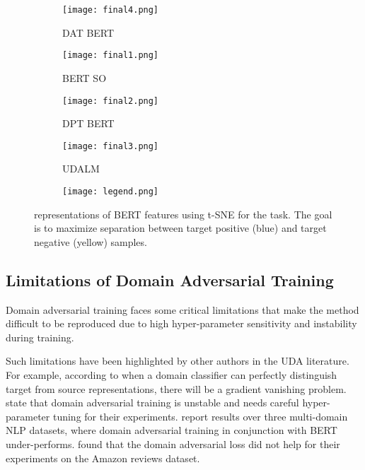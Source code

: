 \documentclass[11pt]{article}
\begin{document}
\begin{figure*}[ht]
\centering
\begin{subfigure}[t]{0.34\textwidth}
\centering
         \texttt{[image: final4.png]}
         \caption{DAT BERT}
         \label{fig:advtsne}
\end{subfigure}
\begin{subfigure}[t]{0.34\textwidth}
\centering
         \texttt{[image: final1.png]}
         \caption{BERT SO}
         \label{fig:atsne}
\end{subfigure}

\begin{subfigure}[t]{0.34\textwidth}
\centering
         \texttt{[image: final2.png]}
         \caption{DPT BERT}
         \label{fig:btsne}
\end{subfigure}
\begin{subfigure}[t]{0.34\textwidth}
\centering
         \texttt{[image: final3.png]}
         \caption{UDALM}
         \label{fig:ctsne}
\end{subfigure}
\begin{subfigure}[t]{0.6\textwidth}
\centering
         \texttt{[image: legend.png]}
         \label{fig:leg}
\end{subfigure}
\vspace*{-4mm}
\caption{ representations of  BERT  features using t-SNE for the  task.
The goal is to maximize separation between target positive (blue) and target negative (yellow) samples.
}
\label{fig:tsne}
\end{figure*}

\subsection{Limitations of Domain Adversarial Training}

Domain adversarial training \citep{ganin2016domain} faces some critical limitations that make the method difficult to be reproduced due to high hyper-parameter sensitivity and instability during training. 

Such limitations have been highlighted by other authors in the UDA literature. For example, according to 
\citet{shen2017wasserstein} when a domain classifier can perfectly distinguish target from source representations, there will be a gradient vanishing problem. \citet{shah-etal-2018-adversarial} state that domain adversarial training is unstable and needs careful hyper-parameter tuning for their experiments. 
\citet{wang2020meta} report results over three multi-domain NLP datasets, where domain adversarial training in conjunction with BERT under-performs. \citet{ruder-plank-2018-strong} found that the domain adversarial loss did not help for their experiments on the Amazon reviews dataset.
\end{document}

